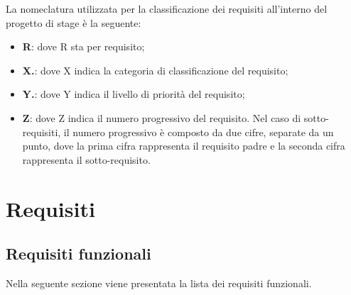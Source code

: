 \newline
La nomeclatura utilizzata per la classificazione dei requisiti all'interno del progetto di stage è la seguente:
\begin{itemize}
    \item \textbf{R}: dove R sta per requisito;
    \item \textbf{X.}: dove X indica la categoria di classificazione del requisito;
    \item \textbf{Y.}: dove Y indica il livello di priorità del requisito;
    \item \textbf{Z}: dove Z indica il numero progressivo del requisito. Nel caso di sotto-requisiti, il numero progressivo è composto da due cifre, separate da un punto,
          dove la prima cifra rappresenta il requisito padre e la seconda cifra rappresenta il sotto-requisito.
\end{itemize}

\newpage
\section{Requisiti}

\subsection{Requisiti funzionali}
Nella seguente sezione viene presentata la lista dei requisiti funzionali. \newline

